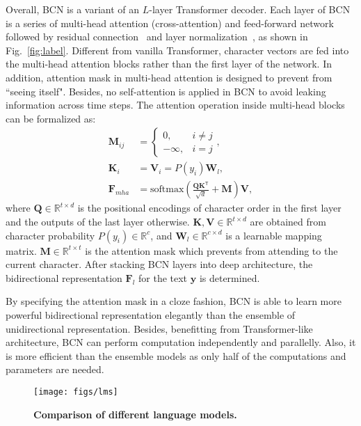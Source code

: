 \documentclass[10pt,journal,compsoc]{IEEEtran}
\begin{document}
Overall, BCN is a variant of an $L$-layer Transformer decoder. Each layer of BCN is a series of multi-head attention (cross-attention) and feed-forward network~\cite{vaswani2017attention} followed by residual connection~\cite{he2016deep} and layer normalization~\cite{ba2016layer}, as shown in Fig.~\ref{fig:label}. Different from vanilla Transformer, character vectors are fed into the multi-head attention blocks rather than the first layer of the network. In addition, attention mask in multi-head attention is designed to prevent from “seeing itself". Besides, no self-attention is applied in BCN to avoid leaking information across time steps. The attention operation inside multi-head blocks can be formalized as:
\begin{align}
\mathbf{M}_{ij} &= \begin{cases} 0, & i \neq j \\ -\infty, & i = j \end{cases}, \label{eq:att:mask} \\
\mathbf{K}_i &= \mathbf{V}_i = P(y_i) \mathbf{W}_l,  \\
\mathbf{F}_{mha} &= \text{softmax}(\frac{\mathbf{Q}\mathbf{K}^\mathsf{T}}{\sqrt{d}} + \mathbf{M})\mathbf{V},
\end{align}
where $\mathbf{Q} \in \mathbb{R}^{t \times d}$ is the positional encodings of character order in the first layer and the outputs of the last layer otherwise. $\mathbf{K}, \mathbf{V} \in \mathbb{R}^{t \times d}$ are obtained from character probability $P(y_i) \in \mathbb{R}^{c}$, and $\mathbf{W}_l \in \mathbb{R}^{c \times d}$ is a learnable mapping matrix. $\mathbf{M} \in \mathbb{R}^{t \times t}$ is the attention mask which prevents from attending to the current character. After stacking BCN layers into deep architecture, the bidirectional representation $\mathbf{F}_{l}$ for the text $\bm{y}$ is determined.

By specifying the attention mask in a cloze fashion, BCN is able to learn more powerful bidirectional representation elegantly than the ensemble of unidirectional representation. Besides, benefitting from Transformer-like architecture, BCN can perform computation independently and parallelly. Also, it is more efficient than the ensemble models as only half of the computations and parameters are needed.


\begin{figure}
   \begin{center}
      \texttt{[image: figs/lms]}
      \caption{\textbf{Comparison of different language models.}}
      \label{fig:comparisons_lms}
   \end{center}
   \vspace{-1.5em}   
\end{figure}
\end{document}
